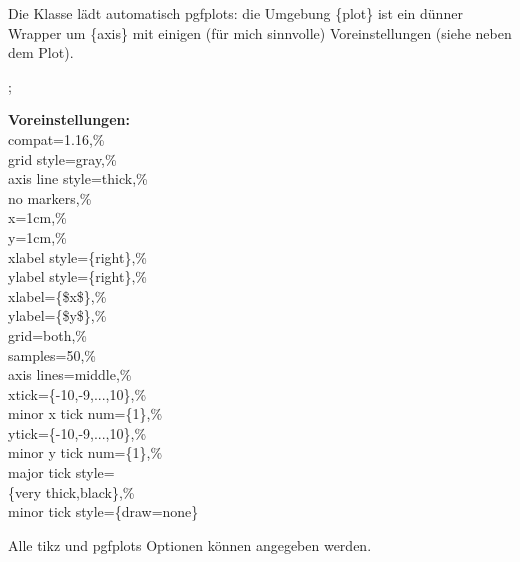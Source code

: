 \documentclass[hyperworksheet]{drcschool}
\newcommand*{\pkg}[1]{\textup{\ttfamily#1}}                                     %
\newcommand*{\env}[1]{\textup{\ttfamily\{#1\}}}                                 %
\begin{document}
\begin{worksheet}[Verschiedenes]
\exercise[Plots]
Die Klasse lädt automatisch \pkg{pgfplots}: die Umgebung \env{plot} ist
ein dünner Wrapper um \env{axis} mit einigen (für mich sinnvolle) Voreinstellungen
(siehe neben dem Plot).

\noindent
\begin{plot}[xmin=-5,xmax=5,ymin=-3.7,ymax=4.5]
 ;
\end{plot}\hfill
\parbox[b]{.3\linewidth}{%
   \footnotesize
   \textbf{Voreinstellungen:}\\
   \ttfamily
   compat=1.16,\%\\
   grid style=gray,\%\\
   axis line style=thick,\%\\
   no markers,\%\\
   x=1cm,\%\\
   y=1cm,\%\\
   xlabel style=\{right\},\%\\
   ylabel style=\{right\},\%\\
   xlabel=\{\$x\$\},\%\\
   ylabel=\{\$y\$\},\%\\
   grid=both,\%\\
   samples=50,\%\\
   axis lines=middle,\%\\
   xtick=\{-10,-9,...,10\},\%\\
   minor x tick num=\{1\},\%\\
   ytick=\{-10,-9,...,10\},\%\\
   minor y tick num=\{1\},\%\\
   major tick style=\\\null\qquad\{very thick,black\},\%\\
   minor tick style=\{draw=none\}
}

\noindent
Alle \pkg{tikz} und \pkg{pgfplots} Optionen können angegeben werden.


\end{worksheet}
\end{document}
